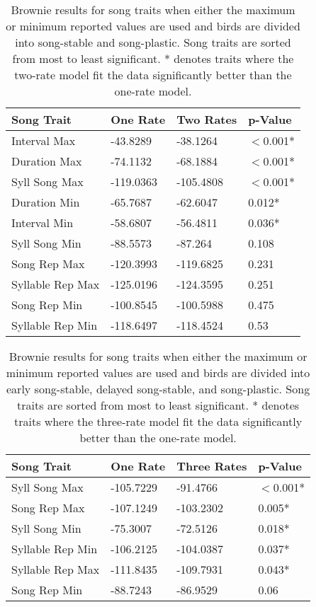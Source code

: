 \documentclass[a4paper,12pt]{article}
\begin{document}
\begin{table}[ht]
\caption{Brownie results for song traits when either the maximum or minimum reported values are used and birds are divided into song-stable and song-plastic. Song traits are sorted from most to least significant. * denotes traits where the two-rate model fit the data significantly better than the one-rate model.}
\centering
\begin{tabular}{llll}
  \hline
Song Trait & One Rate & Two Rates & p-Value \\ 
  \hline
Interval Max & -43.8289 & -38.1264 & $<$0.001* \\ 
  Duration Max & -74.1132 & -68.1884 & $<$0.001* \\ 
  Syll Song Max & -119.0363 & -105.4808 & $<$0.001* \\ 
  Duration Min & -65.7687 & -62.6047 & 0.012* \\ 
  Interval Min & -58.6807 & -56.4811 & 0.036* \\ 
  Syll Song Min & -88.5573 & -87.264 & 0.108 \\ 
  Song Rep Max & -120.3993 & -119.6825 & 0.231 \\ 
  Syllable Rep Max & -125.0196 & -124.3595 & 0.251 \\ 
  Song Rep Min & -100.8545 & -100.5988 & 0.475 \\ 
  Syllable Rep Min & -118.6497 & -118.4524 & 0.53 \\ 
   \hline
\end{tabular}
\end{table}



\begin{table}[ht]
\caption{Brownie results for song traits when either the maximum or minimum reported values are used and birds are divided into  early song-stable, delayed song-stable, and song-plastic. Song traits are sorted from most to least significant. * denotes traits where the three-rate model fit the data significantly better than the one-rate model.}
\centering
\begin{tabular}{llll}
  \hline
Song Trait & One Rate & Three Rates & p-Value \\ 
  \hline
  Syll Song Max & -105.7229 & -91.4766 & $<$0.001* \\ 
  Song Rep Max & -107.1249 & -103.2302 & 0.005* \\ 
  Syll Song Min & -75.3007 & -72.5126 & 0.018* \\ 
  Syllable Rep Min & -106.2125 & -104.0387 & 0.037* \\ 
  Syllable Rep Max & -111.8435 & -109.7931 & 0.043* \\ 
  Song Rep Min & -88.7243 & -86.9529 & 0.06 \\ 
   \hline
\end{tabular}
\end{table}
\end{document}
